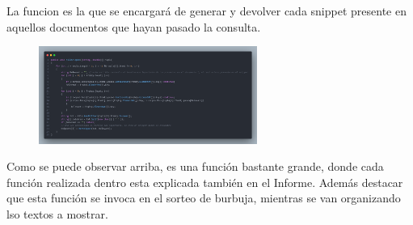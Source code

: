 \begin{frame}
    La funcion  es la que se encargará de generar y devolver cada snippet presente en aquellos documentos que hayan pasado la consulta.
    \begin{figure}
        \includegraphics[width=270px]{Assets/fill_snippet.png}
    \end{figure}
    Como se puede observar arriba, es una función bastante grande, donde cada función realizada dentro esta explicada también en el Informe. Además destacar que esta función se invoca en el sorteo de burbuja, mientras se van organizando lso textos a mostrar.
\end{frame}